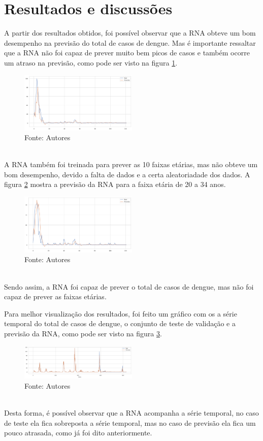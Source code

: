 \documentclass[
	article,			%
	12pt,				%
	a4paper,			%
	chapter=TITLE,		%
	section=TITLE,		%
	subsection=TITLE,	%
	subsubsection=TITLE %
	english,			%
	brazil,				%
	sumario=tradicional
	]{abntex2}
\begin{document}
\section{Resultados e discussões}
A partir dos resultados obtidos, foi possível observar que a RNA obteve um bom desempenho na previsão do total de casos de dengue. Mas é importante ressaltar que a RNA não foi capaz de prever muito bem picos de casos e também ocorre um atraso na previsão, como pode ser visto na figura \ref{figure5}. 
\begin{figure}[htbp]
	\centering
	\includegraphics[width=0.5\textwidth]{imagens/imgCodigos/previsaoYtesteCasosTotais.png}
	\caption{Fonte: Autores}
	\label{figure5}
\end{figure}
\\ \indent
A RNA também foi treinada para prever as 10 faixas etárias, mas não obteve um bom desempenho, devido a falta de dados e a certa aleatoriadade dos dados. A figura \ref{figure6} mostra a previsão da RNA para a faixa etária de 20 a 34 anos.
\begin{figure}[htbp]
	\centering
	\includegraphics[width=0.5\textwidth]{imagens/imgCodigos/previsaoYteste2034.png}
	\caption{Fonte: Autores}
	\label{figure6}
\end{figure}
\\ \indent
Sendo assim, a RNA foi capaz de prever o total de casos de dengue, mas não foi capaz de prever as faixas etárias.
\\ \indent

Para melhor visualização dos resultados, foi feito um gráfico com os a série temporal do total de casos de dengue, o conjunto de teste de validação e a previsão da RNA, como pode ser visto na figura \ref{figure7}. 
\begin{figure}[htbp]
	\centering
	\includegraphics[width=0.5\textwidth]{imagens/imgCodigos/previsaoFullCasosTotais.png}
	\caption{Fonte: Autores}
	\label{figure7}
\end{figure}
\\ \indent
Desta forma, é possível observar que a RNA acompanha a série temporal, no caso de teste ela fica sobreposta a série temporal, mas no caso de previsão ela fica um pouco atrasada, como já foi dito anteriormente.
\\ \indent
\end{document}
